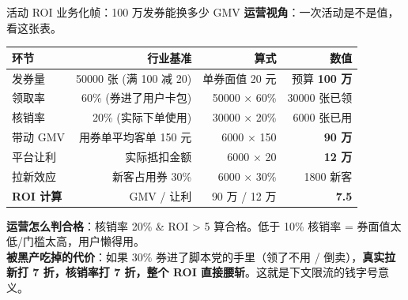 \documentclass[aspectratio=169,11pt]{beamer}
\begin{document}
\begin{frame}[shrink]{活动 ROI 业务化帧：100 万发券能换多少 GMV}
\scriptsize \textbf{运营视角}：一次活动是不是值，看这张表。
\begin{tabular}{@{}lrrr@{}}
\toprule
环节 & 行业基准 & 算式 & 数值 \\
\midrule
发券量            & 50000 张 (满 100 减 20)  & 单券面值 20 元 & 预算 \textbf{100 万} \\
领取率            & 60\% (券进了用户卡包)    & 50000 × 60\% & 30000 张已领 \\
核销率            & 20\% (实际下单使用)      & 30000 × 20\% & 6000 张已用 \\
带动 GMV          & 用券单平均客单 150 元    & 6000 × 150 & \textbf{90 万} \\
平台让利          & 实际抵扣金额             & 6000 × 20 & \textbf{12 万} \\
拉新效应          & 新客占用券 30\%          & 6000 × 30\% & 1800 新客 \\
\midrule
\textbf{ROI 计算} & GMV / 让利               & 90 万 / 12 万 & \textbf{7.5} \\
\bottomrule
\end{tabular}
\vspace{2mm}
\small \textbf{运营怎么判合格}：核销率 20\% \& ROI > 5 算合格。低于 10\% 核销率 = 券面值太低/门槛太高，用户懒得用。\\
\textbf{被黑产吃掉的代价}：如果 30\% 券进了脚本党的手里（领了不用 / 倒卖），\textbf{真实拉新打 7 折，核销率打 7 折，整个 ROI 直接腰斩}。这就是下文限流的钱字号意义。
\end{frame}
\end{document}
